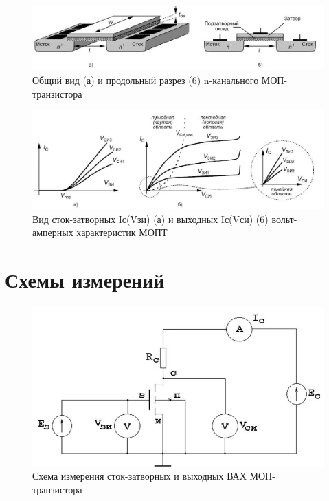 \documentclass[a4paper,14pt]{article}
\begin{document}
\begin{figure}
	\centering
	\includegraphics[width=\linewidth]{image/Teor_MOP_3}
	\caption{Общий вид (а) и продольный разрез (6) n-канального МОП-транзистора}
	\label{fig:teormop3}
\end{figure}

\begin{figure}
	\centering
	\includegraphics[width=\linewidth]{image/Teor_MOP_4}
	\caption{Вид сток-затворных Iс(Vзи) (а) и выходных Iс(Vси) (6) вольт- амперных характеристик МОПТ}
	\label{fig:teormop4}
\end{figure}

\section{Схемы измерений}

\begin{figure}[H]
	\centering
	\includegraphics[width=\linewidth]{image/Exp_scema}
	\caption{Схема измерения сток-затворных и выходных ВАХ МОП-транзистора}
	\label{fig:expscema}
\end{figure}
\end{document}
